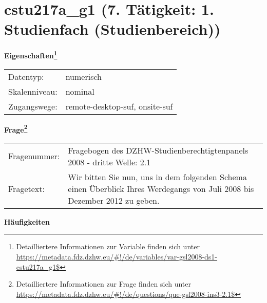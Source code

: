 
    \setcounter{footnote}{0}

    \vspace*{-1.8cm}
	\section{cstu217a\_g1 (7. Tätigkeit: 1. Studienfach (Studienbereich))}
	\label{section:cstu217a_g1}



    \vspace*{0.5cm}
    \noindent\textbf{Eigenschaften\footnote{Detailliertere Informationen zur Variable finden sich unter
		\url{https://metadata.fdz.dzhw.eu/\#!/de/variables/var-gsl2008-ds1-cstu217a_g1$}}}\\
	\begin{tabularx}{\hsize}{@{}lX}
	Datentyp: & numerisch \\
	Skalenniveau: & nominal \\
	Zugangswege: &
	  remote-desktop-suf, 
	  onsite-suf
 \\
    \end{tabularx}



				\vspace*{0.5cm}
                \noindent\textbf{Frage\footnote{Detailliertere Informationen zur Frage finden sich unter
		              \url{https://metadata.fdz.dzhw.eu/\#!/de/questions/que-gsl2008-ins3-2.1$}}}\\
				\begin{tabularx}{\hsize}{@{}lX}
					Fragenummer: &
					  Fragebogen des DZHW-Studienberechtigtenpanels 2008 - dritte Welle:
					  2.1
 \\
					Fragetext: & Wir bitten Sie nun, uns in dem folgenden Schema einen Überblick Ihres Werdegangs von Juli 2008 bis Dezember 2012 zu geben. \\
				\end{tabularx}





        		\vspace*{0.5cm}
                \noindent\textbf{Häufigkeiten}

